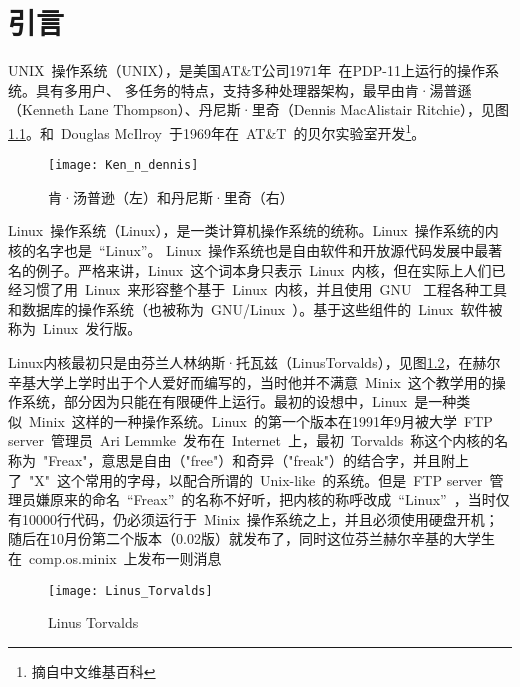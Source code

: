 \documentclass[../Main/thesis.tex]{subfiles}
\begin{document}
\chapter{引言}
\label{cha:intro}
UNIX~操作系统（UNIX），是美国AT\&T公司1971年~在PDP-11上运行的操作系统。具有多用户、 多任务的特点，支持多种处理器架构，最早由肯·湯普遜（Kenneth Lane Thompson）、丹尼斯·里奇（Dennis MacAlistair Ritchie），见图\ref{fig:ken}。和~Douglas McIlroy~于1969年在~AT\&T~的贝尔实验室开发\footnote{摘自中文维基百科}。

\begin{figure}[htbp]
  \centering
  \texttt{[image: Ken\_n\_dennis]}
  \caption{肯·汤普逊（左）和丹尼斯·里奇（右）}
  \label{fig:ken}
\end{figure}
Linux~操作系统（Linux），是一类计算机操作系统的统称。Linux~操作系统的内核的名字也是~“Linux”。 Linux~操作系统也是自由软件和开放源代码发展中最著名的例子。严格来讲，Linux~这个词本身只表示~Linux~内核，但在实际上人们已经习惯了用~Linux~来形容整个基于~Linux~内核，并且使用~GNU~ 工程各种工具和数据库的操作系统（也被称为~GNU/Linux~）。基于这些组件的~Linux~软件被称为~Linux~发行版。

Linux内核最初只是由芬兰人林纳斯·托瓦兹（LinusTorvalds），见图\ref{fig:linus}，在赫尔辛基大学上学时出于个人爱好而编写的，当时他并不满意~Minix~这个教学用的操作系统，部分因为只能在有限硬件上运行。最初的设想中，Linux~是一种类似~Minix~这样的一种操作系统。Linux~的第一个版本在1991年9月被大学~FTP server~管理员~Ari Lemmke~发布在~Internet~上，最初~Torvalds~称这个内核的名称为~"Freax"，意思是自由（"free"）和奇异（"freak"）的结合字，并且附上了~"X"~这个常用的字母，以配合所谓的~Unix-like~的系统。但是~FTP server~管理员嫌原来的命名~“Freax”~的名称不好听，把内核的称呼改成~“Linux”~，当时仅有10000行代码，仍必须运行于~Minix~操作系统之上，并且必须使用硬盘开机；随后在10月份第二个版本（0.02版）就发布了，同时这位芬兰赫尔辛基的大学生在~comp.os.minix~上发布一则消息

\begin{center}
\end{center}
\begin{figure}[htbp]
  \centering
  \texttt{[image: Linus\_Torvalds]}
  \caption{Linus Torvalds}
  \label{fig:linus}
\end{figure}
\end{document}
